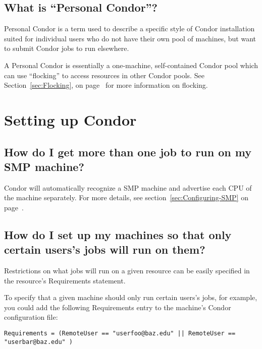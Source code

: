 
\subsection{What is ``Personal Condor''?}

Personal Condor is a term used to describe a specific style of Condor
installation suited for individual users who do not have their own
pool of machines, but want to submit Condor jobs to run elsewhere.

A Personal Condor is essentially a one-machine, self-contained Condor
pool which can use ``flocking'' to access resources in other Condor
pools.
See Section~\ref{sec:Flocking}, on page~\pageref{sec:Flocking} for
more information on flocking.


\section{Setting up Condor}

\subsection{How do I get more than one job to run on my SMP machine?}

Condor will automatically recognize a SMP machine and advertise each
CPU of the machine separately.
For more details, see section~\ref{sec:Configuring-SMP} on
page~\pageref{sec:Configuring-SMP}.

\subsection{How do I set up my machines so that only certain users's
jobs will run on them?}

Restrictions on what jobs will run on a given resource can be easily
specified in the resource's Requirements statement.

To specify that a given machine should only run certain users's jobs,
for example, you could add the following Requirements entry to the
machine's Condor configuration file:

\begin{verbatim}Requirements = (RemoteUser == "userfoo@baz.edu" || RemoteUser == "userbar@baz.edu" )\end{verbatim}

